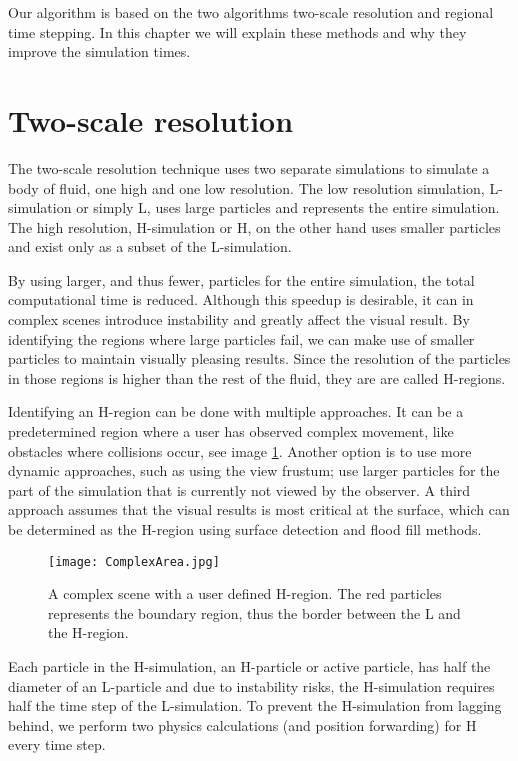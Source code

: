 \documentclass[../../main.tex]{subfiles}
\begin{document}
\tracingall


Our algorithm is based on the two algorithms two-scale resolution and regional time stepping. In this chapter we will explain these methods and why they improve the simulation times. 

\section{Two-scale resolution}
The two-scale resolution technique uses two separate simulations to simulate a body of fluid, one high and one low resolution. The low resolution simulation, L-simulation or simply L, uses large particles and represents the entire simulation. The high resolution, H-simulation or H, on the other hand uses smaller particles and exist only as a subset of the L-simulation. 

By using larger, and thus fewer, particles for the entire simulation, the total computational time is reduced. Although this speedup is desirable, it can in complex scenes introduce instability and greatly affect the visual result. By identifying the regions where large particles fail, we can make use of smaller particles to maintain visually pleasing results. Since the resolution of the particles in those regions is higher than the rest of the fluid, they are are called H-regions.

Identifying an H-region can be done with multiple approaches. It can be a predetermined region where a user has observed complex movement, like obstacles where collisions occur, see image \ref{fig:complexarea}. Another option is to use more dynamic approaches, such as using the view frustum; use larger particles for the part of the simulation that is currently not viewed by the observer. A third approach assumes that the visual results is most critical at the surface, which can be determined as the H-region using surface detection and flood fill methods.

\begin{figure}[h!]
    \centering
    \texttt{[image: ComplexArea.jpg]}
    \caption[Complex scene with user defined H-region]{A complex scene with a user defined H-region. The red particles represents the boundary region, thus the border between the L and the H-region. }
    \label{fig:complexarea}
\end{figure}

Each particle in the H-simulation, an H-particle or active particle, has half the diameter of an L-particle and due to instability risks, the H-simulation requires half the time step of the L-simulation. To prevent the H-simulation from lagging behind, we perform two physics calculations (and position forwarding) for H every time step. 
\end{document}
